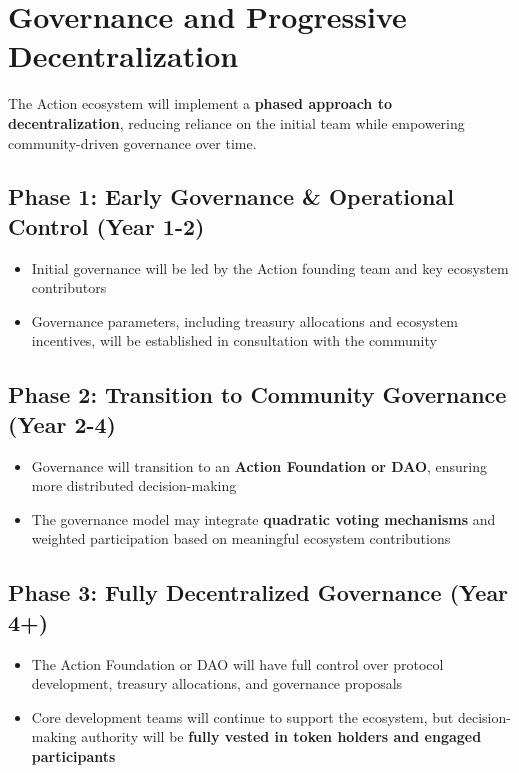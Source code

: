 \section{Governance and Progressive Decentralization}
The Action ecosystem will implement a \textbf{phased approach to decentralization}, reducing reliance on the initial team while empowering community-driven governance over time.

\subsection{Phase 1: Early Governance \& Operational Control (Year 1-2)}
\begin{itemize}
\item Initial governance will be led by the Action founding team and key ecosystem contributors
\item Governance parameters, including treasury allocations and ecosystem incentives, will be established in consultation with the community
\end{itemize}

\subsection{Phase 2: Transition to Community Governance (Year 2-4)}
\begin{itemize}
\item Governance will transition to an \textbf{Action Foundation or DAO}, ensuring more distributed decision-making
\item The governance model may integrate \textbf{quadratic voting mechanisms} and weighted participation based on meaningful ecosystem contributions
\end{itemize}

\subsection{Phase 3: Fully Decentralized Governance (Year 4+)}
\begin{itemize}
\item The Action Foundation or DAO will have full control over protocol development, treasury allocations, and governance proposals
\item Core development teams will continue to support the ecosystem, but decision-making authority will be \textbf{fully vested in token holders and engaged participants}
\end{itemize}
